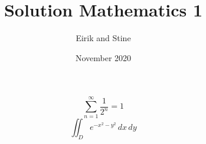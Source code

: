 \documentclass{article}
\title{Solution Mathematics 1}
\author{Eirik and Stine}
\date{November 2020}
\begin{document}
\maketitle

\[\sum_{n=1}^{\infty}\frac{1}{2^{n}}=1\]
\[\iint_{D}e^{-x^2-y^2}\,dx\,dy\]
\end{document}
